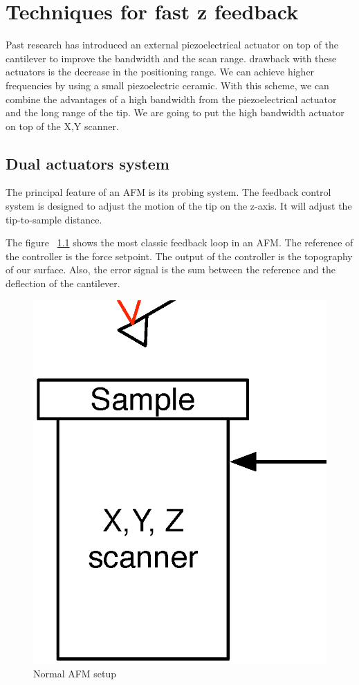 \chapter{Techniques for fast z feedback}

Past research has introduced an external piezoelectrical actuator on top of the cantilever to improve the bandwidth and the scan range. drawback with these actuators is the decrease in the positioning range. We can achieve higher frequencies by using a small piezoelectric ceramic.\cite{sulchek1999dual} With this scheme, we can combine the advantages of a high bandwidth from the piezoelectrical actuator and the long range of the tip. We are going to put the high bandwidth actuator on top of the X,Y scanner.

\section{Dual actuators system}
\label{sec:dualactuator}
The principal feature of an AFM is its probing system. The feedback control system is designed to adjust the motion of the tip on the z-axis. It will adjust the tip-to-sample distance. 

The figure ~\ref{fig:normalAFM} shows the most classic feedback loop in an AFM. The reference of the controller is the force setpoint. The output of the controller is the topography of our surface. Also, the error signal is the sum between the reference and the deflection of the cantilever.

\begin{figure}[!htb]
  \centering
  \includegraphics[scale=0.3]{images/normalafm.eps}
    \caption{Normal AFM setup}
  \label{fig:normalAFM}
\end{figure}

